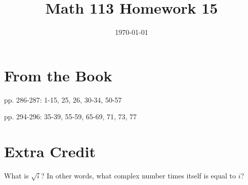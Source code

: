 \documentclass[fleqn,addpoints]{exam}
\title{Math 113 Homework 15}
\author{}
\date{\today}
\begin{document}
\maketitle

\section{From the Book}

\begin{itemize*}
  \item pp. 286-287: 1-15, 25, 26, 30-34, 50-57 
  \item pp. 294-296: 35-39, 55-59, 65-69, 71, 73, 77 
\end{itemize*}

\section{Extra Credit}

What is $\sqrt{i}$?  In other words, what complex number times itself is equal to $i$?
\end{document}
